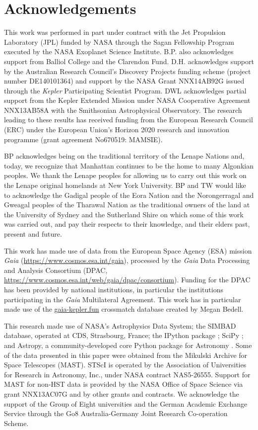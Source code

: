 \documentclass[a4paper,fleqn,usenatbib]{mnras}
\begin{document}
\section*{Acknowledgements} %

This work was performed in part under contract with the Jet Propulsion Laboratory (JPL) funded by NASA through the Sagan Fellowship Program executed by the NASA Exoplanet Science Institute. B.P. also acknowledges support from Balliol College and the Clarendon Fund. D.H. acknowledges support by the Australian Research Council's Discovery Projects funding scheme (project number DE140101364) and support by the NASA Grant NNX14AB92G issued through the \emph{Kepler} Participating Scientist Program. DWL acknowledges partial support from the Kepler Extended Mission under NASA Cooperative Agreement NNX13AB58A with the Smithsonian Astrophysical Observatory. The research leading to these results has received funding from the European Research Council (ERC) under the European Union's Horizon 2020 research and innovation programme (grant agreement No670519: MAMSIE).

BP acknowledges being on the traditional territory of the Lenape Nations and, today, we recognize that Manhattan continues to be the home to many Algonkian peoples. We thank the Lenape peoples for allowing us to carry out this work on the Lenape original homelands at New York University. BP and TW would like to acknowledge the Gadigal people of the Eora Nation and the Norongerragal and Gweagal peoples of the Tharawal Nation as the traditional owners of the land at the University of Sydney and the Sutherland Shire on which some of this work was carried out, and pay their respects to their knowledge, and their elders past, present and future.

This work has made use of data from the European Space Agency (ESA) mission
{\it Gaia} (\url{https://www.cosmos.esa.int/gaia}), processed by the {\it Gaia}
Data Processing and Analysis Consortium (DPAC,
\url{https://www.cosmos.esa.int/web/gaia/dpac/consortium}). Funding for the DPAC
has been provided by national institutions, in particular the institutions
participating in the {\it Gaia} Multilateral Agreement. This work has in particular made use of the \url{gaia-kepler.fun} crossmatch database created by Megan Bedell.

This research made use of NASA's Astrophysics Data System; the SIMBAD database, operated at CDS, Strasbourg, France; the IPython package \citep{PER-GRA:2007}; SciPy \citep{jones_scipy_2001}; and Astropy, a community-developed core Python package for Astronomy \citep{astropy}. Some of the data presented in this paper were obtained from the Mikulski Archive for Space Telescopes (MAST). STScI is operated by the Association of Universities for Research in Astronomy, Inc., under NASA contract NAS5-26555. Support for MAST for non-HST data is provided by the NASA Office of Space Science via grant NNX13AC07G and by other grants and contracts. We acknowledge the support of the Group of Eight universities and the German Academic Exchange Service through the Go8 Australia-Germany Joint Research Co-operation Scheme. 
\end{document}
